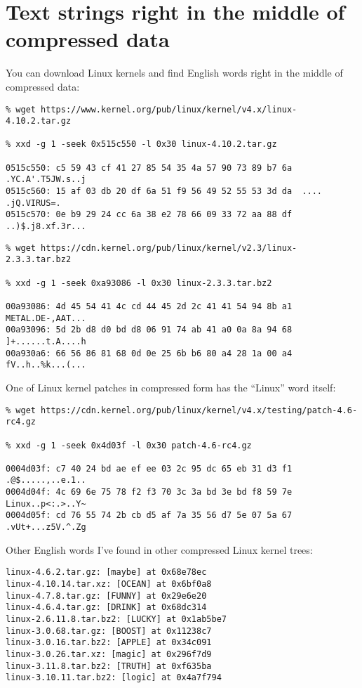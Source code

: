 \section{Text strings right in the middle of compressed data}

You can download Linux kernels and find English words right in the middle of compressed data:

\begin{lstlisting}
% wget https://www.kernel.org/pub/linux/kernel/v4.x/linux-4.10.2.tar.gz

% xxd -g 1 -seek 0x515c550 -l 0x30 linux-4.10.2.tar.gz

0515c550: c5 59 43 cf 41 27 85 54 35 4a 57 90 73 89 b7 6a  .YC.A'.T5JW.s..j
0515c560: 15 af 03 db 20 df 6a 51 f9 56 49 52 55 53 3d da  .... .jQ.VIRUS=.
0515c570: 0e b9 29 24 cc 6a 38 e2 78 66 09 33 72 aa 88 df  ..)$.j8.xf.3r...
\end{lstlisting}

\begin{lstlisting}
% wget https://cdn.kernel.org/pub/linux/kernel/v2.3/linux-2.3.3.tar.bz2

% xxd -g 1 -seek 0xa93086 -l 0x30 linux-2.3.3.tar.bz2

00a93086: 4d 45 54 41 4c cd 44 45 2d 2c 41 41 54 94 8b a1  METAL.DE-,AAT...
00a93096: 5d 2b d8 d0 bd d8 06 91 74 ab 41 a0 0a 8a 94 68  ]+......t.A....h
00a930a6: 66 56 86 81 68 0d 0e 25 6b b6 80 a4 28 1a 00 a4  fV..h..%k...(...
\end{lstlisting}

One of Linux kernel patches in compressed form has the ``Linux'' word itself:

\begin{lstlisting}
% wget https://cdn.kernel.org/pub/linux/kernel/v4.x/testing/patch-4.6-rc4.gz

% xxd -g 1 -seek 0x4d03f -l 0x30 patch-4.6-rc4.gz

0004d03f: c7 40 24 bd ae ef ee 03 2c 95 dc 65 eb 31 d3 f1  .@$.....,..e.1..
0004d04f: 4c 69 6e 75 78 f2 f3 70 3c 3a bd 3e bd f8 59 7e  Linux..p<:.>..Y~
0004d05f: cd 76 55 74 2b cb d5 af 7a 35 56 d7 5e 07 5a 67  .vUt+...z5V.^.Zg
\end{lstlisting}

Other English words I've found in other compressed Linux kernel trees:

\begin{lstlisting}
linux-4.6.2.tar.gz: [maybe] at 0x68e78ec
linux-4.10.14.tar.xz: [OCEAN] at 0x6bf0a8
linux-4.7.8.tar.gz: [FUNNY] at 0x29e6e20
linux-4.6.4.tar.gz: [DRINK] at 0x68dc314
linux-2.6.11.8.tar.bz2: [LUCKY] at 0x1ab5be7
linux-3.0.68.tar.gz: [BOOST] at 0x11238c7
linux-3.0.16.tar.bz2: [APPLE] at 0x34c091
linux-3.0.26.tar.xz: [magic] at 0x296f7d9
linux-3.11.8.tar.bz2: [TRUTH] at 0xf635ba
linux-3.10.11.tar.bz2: [logic] at 0x4a7f794
\end{lstlisting}

